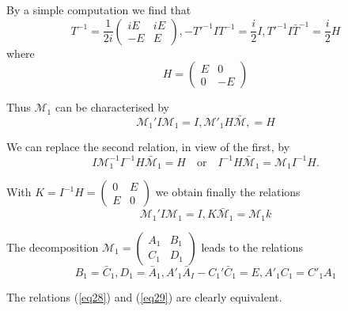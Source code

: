  By a simple computation we find that 
 \begin{equation*}
T^{-1} = \frac{1}{2i} \begin{pmatrix}  iE & iE \\ -E & E \end{pmatrix}
, - T'^{-1} I T^{-1} = \frac{i}{2} I, T'^{-1} I \bar{T}^{-1} =
\frac{i}{2} H \tag{27}\label{eq27}  
 \end{equation*} 
 where
 $$
 H =   
\begin{pmatrix} 
E & 0 \\ 
0 &-E
\end{pmatrix} 
 $$
 
 Thus $\mathcal{M}_1$ can be characterised by 
 $$
 \mathcal{M}_1' I \mathcal{M}_1 = I ,   \mathcal{M}'_1 H
 \bar{\mathcal{M}}, = H  
 $$
 
 We can replace the second relation, in view of the first, by 
 $$
 I \mathcal{M}_1^{-1} I^{-1} H \bar{\mathcal{M}}_1 = H \quad \text{or}
 \quad I^{-1} H  \bar{\mathcal{M}}_1 = \mathcal{M}_1 
 I^{-1} H. 
 $$
 
 With $K = I^{-1} H = \begin{pmatrix}  0 & E \\ E& 0\end{pmatrix}$ we
   obtain finally the relations 
 \begin{equation*}
\mathcal{M}_1' I \mathcal{M}_1 = I,K \bar{\mathcal{M}}_1 =
\mathcal{M}_1 k \tag{28}\label{eq28}  
 \end{equation*} 
 
 The decomposition $\mathcal{M}_1 = \begin{pmatrix}  A_1 & B_1 \\ C_1 & 
   D_1\end{pmatrix}$ leads to the relations 
 \begin{equation*}
B_1 = \bar{C}_1, D_1 = \bar{A}_1, A'_1 \bar{A}_I -C_1' \bar{C}_1 = E,
A'_1 C_1 = C'_1 A_1 \tag{29}\label{eq29}  
 \end{equation*}
 
 The relations (\ref{eq28}) and (\ref{eq29}) are clearly equivalent. 
 
